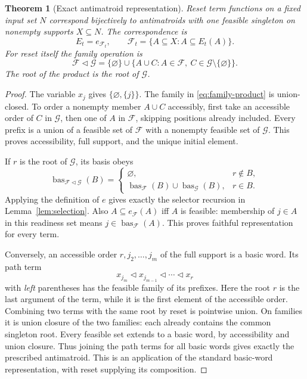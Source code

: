 \documentclass[11pt]{article}
\newtheorem{theorem}{Theorem}[section]
\newcommand{\del}{\mathbin{\triangleleft}}
\newcommand{\bas}{\operatorname{bas}}
\begin{document}
\begin{theorem}[Exact antimatroid representation]\label{thm:anti}
Reset term functions on a fixed input set $N$ correspond bijectively to
antimatroids with one feasible singleton on nonempty supports
$X\subseteq N$. The correspondence is
\[
 E_t=e_{\mathcal F_t},\qquad
 \mathcal F_t=\{A\subseteq X:A\subseteq E_t(A)\}.
\]
For reset itself the family operation is
\begin{equation}\label{eq:family-product}
 \mathcal F\del\mathcal G=
 \{\varnothing\}\cup
 \{A\cup C:A\in\mathcal F,\ C\in\mathcal G\setminus\{\varnothing\}\}.
\end{equation}
The root of the product is the root of $\mathcal G$.
\end{theorem}
\begin{proof}
The variable $x_j$ gives $\{\varnothing,\{j\}\}$.
The family in \eqref{eq:family-product} is union-closed. To order a
nonempty member $A\cup C$ accessibly, first take an accessible order of
$C$ in $\mathcal G$, then one of $A$ in $\mathcal F$, skipping positions
already included. Every prefix is a union of a feasible set of
$\mathcal F$ with a nonempty feasible set of $\mathcal G$. This proves
accessibility, full support, and the unique initial element.

If $r$ is the root of $\mathcal G$, its basis obeys
\[
 \bas_{\mathcal F\del\mathcal G}(B)=
 \begin{cases}
 \varnothing,&r\notin B,\\
 \bas_{\mathcal F}(B)\cup\bas_{\mathcal G}(B),&r\in B.
 \end{cases}
\]
Applying the definition of $e$ gives exactly the selector recursion
in Lemma~\ref{lem:selection}. Also
$A\subseteq e_{\mathcal F}(A)$ iff $A$ is feasible: membership of
$j\in A$ in this readiness set means $j\in\bas_{\mathcal F}(A)$.
This proves faithful representation for every term.

Conversely, an accessible order $r,j_2,\ldots,j_m$ of the full support
is a basic word. Its path term
\[
 x_{j_m}\del x_{j_{m-1}}\del\cdots\del x_r
\]
with \emph{left} parentheses has the feasible family of its prefixes.
Here the root $r$ is the last argument of the term, while it is the
first element of the accessible order. Combining two terms with the
same root by reset is pointwise union. On families it is union closure
of the two families: each already contains the common singleton root.
Every feasible set extends to a basic word, by accessibility and union
closure. Thus joining the path terms for all basic words gives exactly
the prescribed antimatroid. This is an application of the standard
basic-word representation, with reset supplying its composition.
\end{proof}
\end{document}
